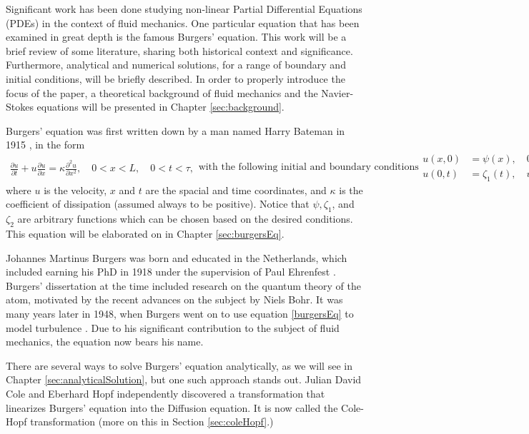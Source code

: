 \documentclass[undefended]{sfuthesis}
\begin{document}
Significant work has been done studying non-linear Partial Differential Equations (PDEs) in the context of fluid mechanics. One particular equation that has been examined in great depth is the famous Burgers' equation. This work will be a brief review of some literature, sharing both historical context and significance. Furthermore, analytical and numerical solutions, for a range of boundary and initial conditions, will be briefly described. In order to properly introduce the focus of the paper, a theoretical background of fluid mechanics and the Navier-Stokes equations will be presented in Chapter \ref{sec:background}.

Burgers' equation was first written down by a man named Harry Bateman in 1915 \cite{bateman}, in the form 
\begin{subequations}
\label{burgersEqBateman}
\begin{align}
\frac{\partial u}{\partial t} + u \frac{\partial u}{\partial x} = \kappa \frac{\partial^2 u}{\partial x^2}, \quad 0 < x < L, \quad 0 < t < \tau, \label{burgersEq}
\end{align}
\text{with the following initial and boundary conditions}
\begin{align}
u(x, 0) &= \psi(x), \quad 0 < x < L, \label{initialCond}\\
u(0, t) &= \zeta_1(t), \quad u(L, t) = \zeta_2(t), \quad 0 < t < \tau, \label{boundConds}
\end{align}
\end{subequations}
where $u$ is the velocity, $x$ and $t$ are the spacial and time coordinates, and $\kappa$ is the coefficient of dissipation (assumed always to be positive). Notice that $\psi, \zeta_1$, and $\zeta_2$ are arbitrary functions which can be chosen based on the desired conditions. This equation will be elaborated on in Chapter \ref{sec:burgersEq}.

Johannes Martinus Burgers was born and educated in the Netherlands, which included earning his PhD in 1918 under the supervision of Paul Ehrenfest \cite{ehrenfest}. Burgers' dissertation at the time included research on the quantum theory of the atom, motivated by the recent advances on the subject by Niels Bohr. It was many years later in 1948, when Burgers went on to use equation \eqref{burgersEq} to model turbulence \cite{JMBurger}. Due to his significant contribution to the subject of fluid mechanics, the equation now bears his name.

There are several ways to solve Burgers' equation analytically, as we will see in Chapter \ref{sec:analyticalSolution}, but one such approach stands out. Julian David Cole and Eberhard Hopf independently discovered a transformation that linearizes Burgers' equation into the Diffusion equation. It is now called the Cole-Hopf transformation (more on this in Section \ref{sec:coleHopf}.)
\end{document}
